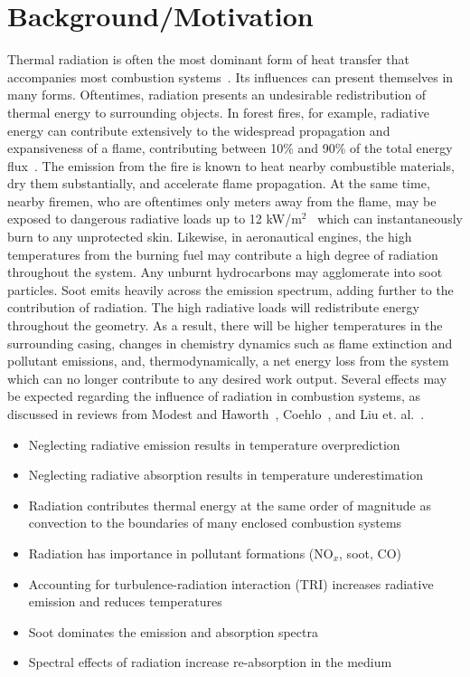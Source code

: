 \section{Background/Motivation}
Thermal radiation is often the most dominant form of heat transfer that accompanies most combustion systems~\cite{Coelho2018RadiativeSystems}. Its influences can present themselves in many forms. 
Oftentimes, radiation presents an undesirable redistribution of thermal energy to surrounding objects.
In forest fires, for example, radiative energy can contribute extensively to the widespread propagation and expansiveness of a flame, contributing between 10\% and 90\% of the total energy flux~\cite{Valendik2008EffectEnvironment}. 
The emission from the fire is known to heat nearby combustible materials, dry them substantially, and accelerate flame propagation. At the same time, nearby firemen, who are oftentimes only meters away from the flame, may be exposed to dangerous radiative loads up to 12 kW/m$^2$~\cite{Valendik2008EffectEnvironment} which can instantaneously burn to any unprotected skin.
Likewise, in aeronautical engines, the high temperatures from the burning fuel may contribute a high degree of radiation throughout the system. Any unburnt hydrocarbons may agglomerate into soot particles.
Soot emits heavily across the emission spectrum, adding further to the contribution of radiation.
The high radiative loads will redistribute energy throughout the geometry. As a result, there will be higher temperatures in the surrounding casing, changes in chemistry dynamics such as flame extinction and pollutant emissions, and, thermodynamically, a net energy loss from the system which can no longer contribute to any desired work output.
Several effects may be expected regarding the influence of radiation in combustion systems, as discussed in reviews from Modest and Haworth~\cite{Modest2016RadiativeSystems}, Coehlo~\cite{Coelho2018RadiativeSystems}, and Liu et. al.~\cite{Liu2020TheFlames}.

\begin{itemize}
    \item Neglecting radiative emission results in temperature overprediction~\cite{Gamil2020AssessmentChamber}
    \item Neglecting radiative absorption results in temperature underestimation
    \item Radiation contributes thermal energy at the same order of magnitude as convection to the boundaries of many enclosed combustion systems~\cite{Gamil2020AssessmentChamber,Johnson2021AnalysisMethod}
    \item Radiation has importance in pollutant formations (NO${}_x$, soot, CO)~\cite{Ihme2008ModelingFormulation,Habibi2007TurbulenceFlames}
    \item Accounting for turbulence-radiation interaction (TRI) increases radiative emission and reduces temperatures
    \item Soot dominates the emission and absorption spectra
    \item Spectral effects of radiation increase re-absorption in the medium~\cite{Wu2021LimitationsFires}
\end{itemize}


